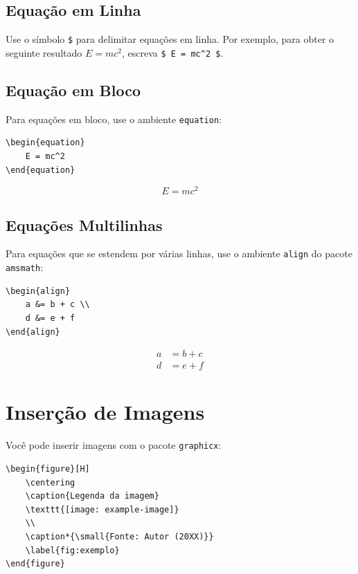 \begin{apendicesenv}
\subsection*{Equação em Linha}
Use o símbolo \texttt{\$} para delimitar equações em linha. Por exemplo, para obter o seguinte resultado \( E = mc^2 \), escreva \verb|$ E = mc^2 $|.

\subsection*{Equação em Bloco}
Para equações em bloco, use o ambiente \texttt{equation}:

\begin{verbatim}
\begin{equation}
    E = mc^2
\end{equation}
\end{verbatim}

\begin{equation}
    E = mc^2
\end{equation}

\subsection*{Equações Multilinhas}
Para equações que se estendem por várias linhas, use o ambiente \texttt{align} do pacote \texttt{amsmath}:

\begin{verbatim}
\begin{align}
    a &= b + c \\
    d &= e + f
\end{align}
\end{verbatim}

\begin{align}
    a &= b + c \\
    d &= e + f
\end{align}

\section*{Inserção de Imagens}
Você pode inserir imagens com o pacote \texttt{graphicx}:

\begin{verbatim}
\begin{figure}[H]
    \centering
    \caption{Legenda da imagem}
    \texttt{[image: example-image]}
    \\
    \caption*{\small{Fonte: Autor (20XX)}}
    \label{fig:exemplo}
\end{figure}
\end{verbatim}


\end{apendicesenv}
